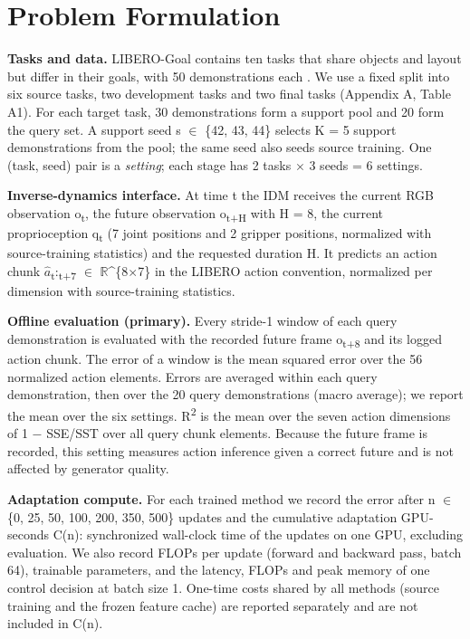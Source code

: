 \documentclass[11pt,a4paper]{article}
\begin{document}
\section{Problem Formulation}

\textbf{Tasks and data.} LIBERO-Goal contains ten tasks that share objects and layout but differ in their goals, with 50 demonstrations each \cite{ref43}. We use a fixed split into six source tasks, two development tasks and two final tasks (Appendix A, Table A1). For each target task, 30 demonstrations form a support pool and 20 form the query set. A support seed s \ensuremath{\in} \{42, 43, 44\} selects K = 5 support demonstrations from the pool; the same seed also seeds source training. One (task, seed) pair is a \emph{setting}; each stage has 2 tasks \ensuremath{\times} 3 seeds = 6 settings.

\textbf{Inverse-dynamics interface.} At time t the IDM receives the current RGB observation o\textsubscript{t}, the future observation o\textsubscript{t+H} with H = 8, the current proprioception q\textsubscript{t} (7 joint positions and 2 gripper positions, normalized with source-training statistics) and the requested duration H. It predicts an action chunk \ensuremath{\hat{a}}\textsubscript{t}:\textsubscript{t+7} \ensuremath{\in} \ensuremath{\mathbb{R}}\^{}\{8\ensuremath{\times}7\} in the LIBERO action convention, normalized per dimension with source-training statistics.

\textbf{Offline evaluation (primary).} Every stride-1 window of each query demonstration is evaluated with the recorded future frame o\textsubscript{t+8} and its logged action chunk. The error of a window is the mean squared error over the 56 normalized action elements. Errors are averaged within each query demonstration, then over the 20 query demonstrations (macro average); we report the mean over the six settings. R\textsuperscript{2} is the mean over the seven action dimensions of 1 \ensuremath{-} SSE/SST over all query chunk elements. Because the future frame is recorded, this setting measures action inference given a correct future and is not affected by generator quality.

\textbf{Adaptation compute.} For each trained method we record the error after n \ensuremath{\in} \{0, 25, 50, 100, 200, 350, 500\} updates and the cumulative adaptation GPU-seconds C(n): synchronized wall-clock time of the updates on one GPU, excluding evaluation. We also record FLOPs per update (forward and backward pass, batch 64), trainable parameters, and the latency, FLOPs and peak memory of one control decision at batch size 1. One-time costs shared by all methods (source training and the frozen feature cache) are reported separately and are not included in C(n).
\end{document}
